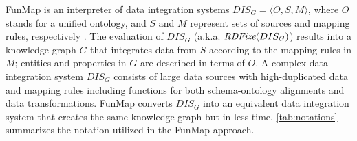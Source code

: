 \begin{table}[h!]
\normalsize
\centering
\caption{Summary of the notation used for defining FunMap}
\label{tab:notations}
\end{table}
FunMap is an interpreter of data integration systems $DIS_G = \langle O,S,M \rangle$, where $O$ stands for a unified ontology, and $S$ and $M$ represent sets of sources and mapping rules, respectively \cite{Lenzerini02}. The evaluation of $DIS_G$ (a.k.a. $\emph{RDFize}(DIS_G)$) results into a knowledge graph $G$ that integrates data from $S$ according to the mapping rules in $M$; entities and properties in $G$ are described in terms of $O$. A complex data integration system $DIS_G$ consists of large data sources with high-duplicated data and mapping rules including functions for both schema-ontology alignments and data transformations. FunMap converts $DIS_G$ into an equivalent data integration system that creates the same knowledge graph but in less time. \autoref{tab:notations} summarizes the notation utilized in the FunMap approach.



